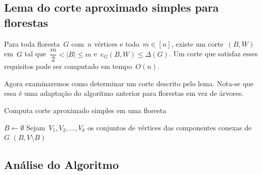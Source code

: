 \bigskip
\bigskip
\bigskip


\subsection{Lema do corte aproximado simples para florestas}

\begin{lem}
\label{lema:simpleApproxCutForest}
	Para toda floresta~$G$ com~$n$ vértices e todo~${m \in [n]}$,
	existe um corte~$(B,W)$ em~$G$ tal 
	que~${\dfrac{m}{2} <|B| \le m}$ e~${e_G(B,W) \le \Delta(G)}$.
	Um corte que satisfaz esses requisitos pode ser computado em
	tempo~$O(n)$.
\end{lem}

\bigskip

Agora examinaremos como determinar um corte descrito pelo lema.
Nota-se que essa é uma adaptação do algoritmo anterior
para florestas em vez de árvores.

\medskip
\medskip

\begin{algorithm}[H]
\label{alg:simpleApproxCutForest}

	\caption{Computa corte aproximado simples em uma floresta}
	$B \gets \emptyset$\;
	Sejam~$V_1, V_2,\ldots, V_k$ os conjuntos de vértices das
	componentes conexas de~$G$\;
	\Return $(B,V\setminus B)$\;

\end{algorithm}	

\bigskip
\bigskip
\bigskip

\subsection*{Análise do Algoritmo}

